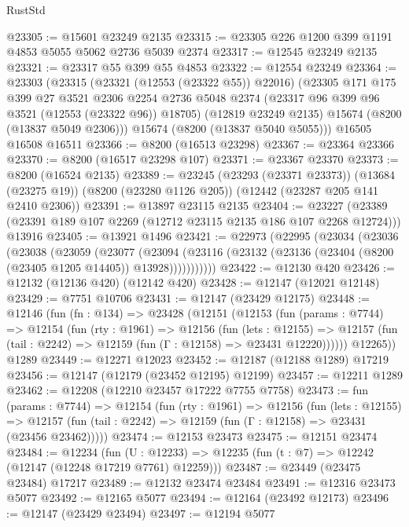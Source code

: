 \begin{lexlean}{RustStd}
\begin{coremodule}
@23305 := @15601 @23249 @2135
@23315 := @23305 @226 @1200 @399 @1191 @4853 @5055 @5062 @2736 @5039 @2374
@23317 := @12545 @23249 @2135
@23321 := @23317 @55 @399 @55 @4853
@23322 := @12554 @23249
@23364 := @23303
    (@23315
      (@23321 (@12553 (@23322 @55)) @22016)
      (@23305
        @171
        @175
        @399
        @27
        @3521
        @2306
        @2254
        @2736
        @5048
        @2374
        (@23317 @96 @399 @96 @3521 (@12553 (@23322 @96)) @18705)
        (@12819 @23249 @2135)
        @15674
        (@8200 (@13837 @5049 @2306)))
      @15674
      (@8200 (@13837 @5040 @5055)))
    @16505
    @16508
    @16511
@23366 := @8200 (@16513 @23298)
@23367 := @23364 @23366
@23370 := @8200 (@16517 @23298 @107)
@23371 := @23367 @23370
@23373 := @8200 (@16524 @2135)
@23389 := @23245
    (@23293 (@23371 @23373))
    (@13684 (@23275 @19))
    (@8200 (@23280 @1126 @205))
    (@12442 (@23287 @205 @141 @2410 @2306))
@23391 := @13897 @23115 @2135
@23404 := @23227
    (@23389 (@23391 @189 @107 @2269 (@12712 @23115 @2135 @186 @107 @2268 @12724)))
    @13916
@23405 := @13921 @1496
@23421 := @22973
    (@22995
      (@23034
        (@23036
          (@23038
            (@23059
              (@23077
                (@23094
                  (@23116 (@23132 (@23136 (@23404 (@8200 (@23405 @1205 @14405)) @13928)))))))))))
@23422 := @12130 @420
@23426 := @12132 (@12136 @420) (@12142 @420)
@23428 := @12147 (@12021 @12148)
@23429 := @7751 @10706
@23431 := @12147 (@23429 @12175)
@23448 := @12146
    (fun (fn : @134) =>
    @23428
      (@12151
        (@12153
          (fun (params : @7744) =>
          @12154
            (fun (rty : @1961) =>
            @12156
              (fun (lets : @12155) =>
              @12157 (fun (tail : @2242) => @12159 (fun (Γ : @12158) => @23431 @12220))))))
        @12265))
    @1289
@23449 := @12271 @12023
@23452 := @12187 (@12188 @1289) @17219
@23456 := @12147 (@12179 (@23452 @12195) @12199)
@23457 := @12211 @1289
@23462 := @12208 (@12210 @23457 @17222 @7755 @7758)
@23473 := fun (params : @7744) =>
  @12154
    (fun (rty : @1961) =>
    @12156
      (fun (lets : @12155) =>
      @12157 (fun (tail : @2242) => @12159 (fun (Γ : @12158) => @23431 (@23456 @23462)))))
@23474 := @12153 @23473
@23475 := @12151 @23474
@23484 := @12234
    (fun (U : @12233) => @12235 (fun (t : @7) => @12242 (@12147 (@12248 @17219 @7761) @12259)))
@23487 := @23449 (@23475 @23484) @17217
@23489 := @12132 @23474 @23484
@23491 := @12316 @23473 @5077
@23492 := @12165 @5077
@23494 := @12164 (@23492 @12173)
@23496 := @12147 (@23429 @23494)
@23497 := @12194 @5077

\end{coremodule}
\end{lexlean}
